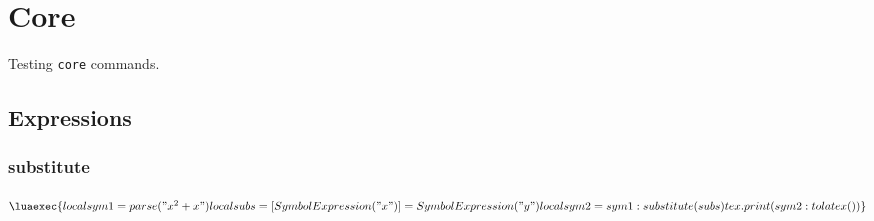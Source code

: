 \documentclass{article}
\begin{document}
\section{Core}
Testing \verb|core| commands. 

\subsection{Expressions}

\subsubsection{substitute}

$\luaexec{
    local sym1 = parse("x^2+x")
    local subs ={[SymbolExpression("x")]=SymbolExpression("y")}
    local sym2 = sym1:substitute(subs)
    tex.print(sym2:tolatex())
}$

    
\end{document}
